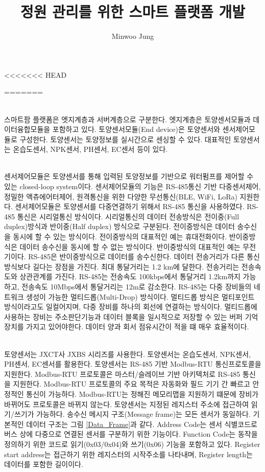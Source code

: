 \documentclass[11pt]{article}
\title{정원 관리를 위한 스마트 플랫폼 개발}
\author{Minwoo Jung}
\begin{document}
<<<<<<< HEAD

\maketitle
=======
\maketitle
\indent \\스마트팜 플랫폼은 엣지계층과 서버계층으로 구분한다. 엣지계층은 토양센서모듈과 데이터융합모듈을 포함하고 있다.
토양센서모듈(End device)은 토양센서와 센서제어모듈로 구성한다. 토양센서는 토양정보를 실시간으로 센싱할 수 있다. 
대표적인 토양센서는 온습도센서, NPK센서, PH센서, EC센서 등이 있다.

\indent \\센서제어모듈은 토양센서를 통해 입력된 토양정보를 기반으로 워터펌프를 제어할 수 있는 closed-loop system이다. 센서제어모듈의 기능은 RS-485통신 기반 다중센서제어, 정밀한 액츄에어터제어, 원격통신을 위한 다양한 무선통신(BLE, WiFi, LoRa) 지원한다. 센서제어모듈은 토양센서를 다중연결하기 위해서 RS-485 통신을 사용하였다. RS-485 통신은 시리얼통신 방식이다. 시리얼통신의 데이터 전송방식은 전이중(Full duplex)방식과 반이중(Half duplex) 방식으로 구분된다. 전이중방식은 데이터 송수신을 동시에 할 수 있는 방식이다. 전이중방식의 대표적인 예는 휴대전화이다. 반이중방식은 데이터 송수신을 동시에 할 수 없는 방식이다. 반이중방식의 대표적인 예는 무전기이다. RS-485은 반이중방식으로 데이터를 송수신한다. 데이터 전송거리가 다른 통신방식보다 길다는 장점을 가진다. 최대 통달거리는 1.2 km에 달한다. 전송거리는 전송속도와 상관관계를 가진다. RS-485는 전송속도 100kbps에서 통달거리 1.2km까지 가능하고, 전송속도 10Mbps에서 통달거리는 12m로 감소한다. RS-485는 다중 장비들의 네트워크 생성이 가능한 멀티드롭(Multi-Drop) 방식이다. 멀티드롭 방식은 멀티포인트 방식이라고도 일컬어지며, 다중 장비를 하나의 회선에 연결하는 방식이다. 멀티드롭에 사용하는 장비는 주소판단기능과 데이터 블록을 일시적으로 저장할 수 있는 버퍼 기억장치를 가지고 있어야한다. 데이터 양과 회서 점유시간이 적을 떄 매우 효율적이다. 

\indent \\토양센서는 JXCT사 JXBS 시리즈를 사용한다. 토양센서는 온습도센서, NPK센서, PH센서, EC센서를 활용한다. 토양센서는 RS-485 기반 Modbus-RTU 통신프로토콜을 지원한다. Modbus-RTU 프로토콜은 마스터/슬레이브 기반 아키텍처로 RS-485 통신을 지원한다. Modbus-RTU 프로토콜의 주요 목적은 자동화와 필드 기기 간 빠르고 안정적인 통신이 가능하다. Modbus-RTU는 정해진 메모리맵을 지원하기 떄문에 장비가 바뀌어도 프로토콜은 바뀌지 않는다. 토양센서는 지정된 레지스터 주소에 접근하여 읽기/쓰기가 가능하다. 송수신 메시지 구조(Message frame)는 모든 센서가 동일하다. 기본적인 데이터 구조는 그림 \ref{Data_Frame}과 같다. Address Code는 센서 식별코드로 버스 상에 다중으로 연결된 센서를 구분하기 위한 기능이다. Function Code는 동작을 정의하기 위한 코드로 읽기(0x03/0x04)와 쓰기(0x06) 기능을 포함하고 있다.
Register start address는 접근하기 위한 레지스터의 시작주소를 나타내며, Register length는 데이터를 포함한 길이이다. 
\end{document}
